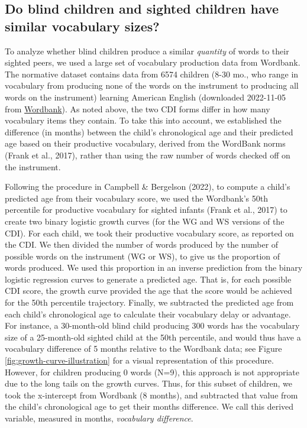 \documentclass[
  man,floatsintext]{apa6}
\begin{document}
\hypertarget{do-blind-children-and-sighted-children-have-similar-vocabulary-sizes}{%
\subsection{Do blind children and sighted children have similar vocabulary sizes?}\label{do-blind-children-and-sighted-children-have-similar-vocabulary-sizes}}

To analyze whether blind children produce a similar \emph{quantity} of words to their sighted peers, we used a large set of vocabulary production data from Wordbank. The normative dataset contains data from 6574 children (8-30 mo., who range in vocabulary from producing none of the words on the instrument to producing all words on the instrument) learning American English (downloaded 2022-11-05 from \href{http://wordbank.stanford.edu/data?name=vocab_norms}{Wordbank}). As noted above, the two CDI forms differ in how many vocabulary items they contain. To take this into account, we established the difference (in months) between the child's chronological age and their predicted age based on their productive vocabulary, derived from the WordBank norms (Frank et al., 2017), rather than using the raw number of words checked off on the instrument.

Following the procedure in Campbell \& Bergelson (2022), to compute a child's predicted age from their vocabulary score, we used the Wordbank's 50th percentile for productive vocabulary for sighted infants (Frank et al., 2017) to create two binary logistic growth curves (for the WG and WS versions of the CDI). For each child, we took their productive vocabulary score, as reported on the CDI. We then divided the number of words produced by the number of possible words on the instrument (WG or WS), to give us the proportion of words produced. We used this proportion in an inverse prediction from the binary logistic regression curves to generate a predicted age. That is, for each possible CDI score, the growth curve provided the age that the score would be achieved for the 50th percentile trajectory. Finally, we subtracted the predicted age from each child's chronological age to calculate their vocabulary delay or advantage. For instance, a 30-month-old blind child producing 300 words has the vocabulary size of a 25-month-old sighted child at the 50th percentile, and would thus have a vocabulary difference of 5 months relative to the Wordbank data; see Figure \ref{fig:growth-curve-illustration} for a visual representation of this procedure. However, for children producing 0 words (N=9), this approach is not appropriate due to the long tails on the growth curves. Thus, for this subset of children, we took the x-intercept from Wordbank (8 months), and subtracted that value from the child's chronological age to get their months difference. We call this derived variable, measured in months, \emph{vocabulary difference}.
\end{document}
